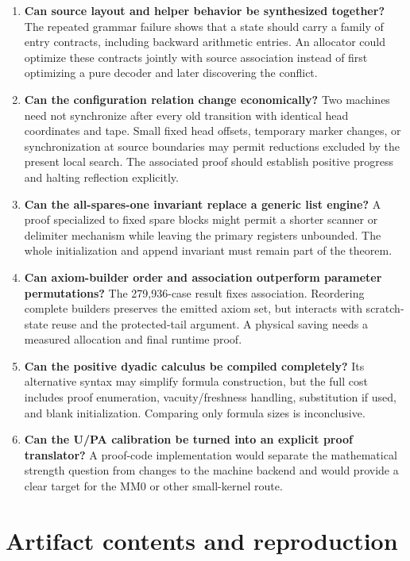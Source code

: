 \documentclass[11pt,a4paper]{article}
\begin{document}
\begin{enumerate}
\item \textbf{Can source layout and helper behavior be synthesized together?}
The repeated grammar failure shows that a state should carry a family of
entry contracts, including backward arithmetic entries. An allocator could
optimize these contracts jointly with source association instead of first
optimizing a pure decoder and later discovering the conflict.
\item \textbf{Can the configuration relation change economically?}
Two machines need not synchronize after every old transition with identical
head coordinates and tape. Small fixed head offsets, temporary marker
changes, or synchronization at source boundaries may permit reductions
excluded by the present local search. The associated proof should establish
positive progress and halting reflection explicitly.
\item \textbf{Can the all-spares-one invariant replace a generic list engine?}
A proof specialized to fixed spare blocks might permit a shorter scanner
or delimiter mechanism while leaving the primary registers unbounded.
The whole initialization and append invariant must remain part of the
theorem.
\item \textbf{Can axiom-builder order and association outperform parameter
permutations?} The 279,936-case result fixes association. Reordering complete
builders preserves the emitted axiom set, but interacts with scratch-state
reuse and the protected-tail argument. A physical saving needs a measured
allocation and final runtime proof.
\item \textbf{Can the positive dyadic calculus be compiled completely?}
Its alternative syntax may simplify formula construction, but the full cost
includes proof enumeration, vacuity/freshness handling, substitution if used,
and blank initialization. Comparing only formula sizes is inconclusive.
\item \textbf{Can the U/PA calibration be turned into an explicit proof
translator?} A proof-code implementation would separate the mathematical
strength question from changes to the machine backend and would provide a
clear target for the MM0 or other small-kernel route.
\end{enumerate}

\section{Artifact contents and reproduction}\label{sec:reproduce}
\end{document}
